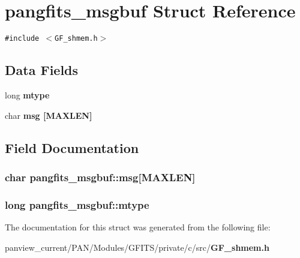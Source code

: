 \section{pangfits\_\-msgbuf Struct Reference}
\label{structpangfits__msgbuf}
{\tt \#include $<$GF\_\-shmem.h$>$}

\subsection*{Data Fields}
\begin{CompactItemize}
\item 
long \bf{mtype}
\item 
char \bf{msg} [MAXLEN]
\end{CompactItemize}


\subsection{Field Documentation}
\subsubsection{\setlength{\rightskip}{0pt plus 5cm}char \bf{pangfits\_\-msgbuf::msg}[MAXLEN]}\label{structpangfits__msgbuf_a71f417fd86a21f8293dfe454c2ab5a8}


\subsubsection{\setlength{\rightskip}{0pt plus 5cm}long \bf{pangfits\_\-msgbuf::mtype}}\label{structpangfits__msgbuf_dee0e0a3569eac5f18b8eb9e716238e6}




The documentation for this struct was generated from the following file:\begin{CompactItemize}
\item 
panview\_\-current/PAN/Modules/GFITS/private/c/src/\bf{GF\_\-shmem.h}\end{CompactItemize}
